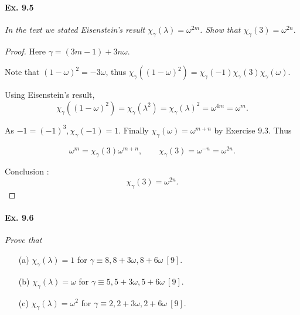 \documentclass[11pt,a4paper]{article}
\begin{document}
\paragraph{Ex. 9.5}
{\it In the text we stated Eisenstein's result $\chi_\gamma(\lambda) = \omega^{2m}$. Show that $\chi_{\gamma}(3) = \omega^{2n}$.
}

\begin{proof} Here $\gamma = (3m-1) + 3n\omega$.

Note that $(1-\omega)^2 = -3 \omega$, thus $\chi_\gamma((1-\omega)^2) = \chi_\gamma(-1)\chi_\gamma(3)\chi_\gamma(\omega)$.

Using Eisenstein's result,
$$\chi_\gamma((1-\omega)^2)= \chi_\gamma(\lambda^2) =\chi_\gamma(\lambda)^2 =\omega^{4m} = \omega^m.$$

As $-1 = (-1)^3, \chi_\gamma(-1) = 1$. Finally  $\chi_\gamma(\omega) = \omega^{m+n}$ by Exercise 9.3. Thus

$$\omega^m = \chi_\gamma(3) \omega^{m+n},\qquad  \chi_\gamma(3) = \omega^{-n} = \omega^{2n}.$$

Conclusion : 
$$\chi_\gamma(3) = \omega^{2n}.$$
\end{proof}

\paragraph{Ex. 9.6}

{\it Prove that
\begin{enumerate}
\item[(a)] $\chi_\gamma(\lambda) = 1$ for $\gamma \equiv 8, 8 + 3\omega, 8 + 6 \omega \ [9]$.
\item[(b)] $\chi_\gamma(\lambda) = \omega$ for $\gamma \equiv 5, 5 + 3\omega, 5 + 6 \omega \ [9]$.
\item[(c)]$\chi_\gamma(\lambda) = \omega^2$ for $\gamma \equiv 2, 2 + 3\omega, 2 + 6 \omega \ [9]$.
\end{enumerate}
}
\end{document}
